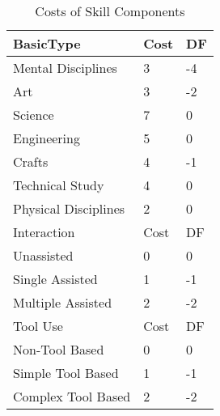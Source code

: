 \begin{table}
	\begin{tabular}{lll}
    BasicType           & Cost          & DF \\
	\hline
	Mental Disciplines      &       3         & -4 \\
	Art                     &       3         & -2 \\
	Science                 &       7         & 0 \\
	Engineering             &       5         & 0 \\
	Crafts                  &       4         & -1 \\
	Technical Study         &       4         & 0 \\
	Physical Disciplines    &       2         & 0 \\
    \hline
    Interaction                    & Cost          & DF \\
	\hline
	Unassisted              &       0         & 0 \\
	Single Assisted         &       1         & -1 \\
	Multiple Assisted       &       2         & -2 \\    \hline
    Tool Use                       & Cost          & DF \\
	\hline
	Non-Tool Based          &       0         & 0 \\
	Simple Tool Based      &        1         & -1 \\
	Complex Tool Based      &       2         & -2 \\    \hline
	\end{tabular}
    \caption{Costs of Skill Components}\label{Table:SkillComponentCosts}
\end{table}


